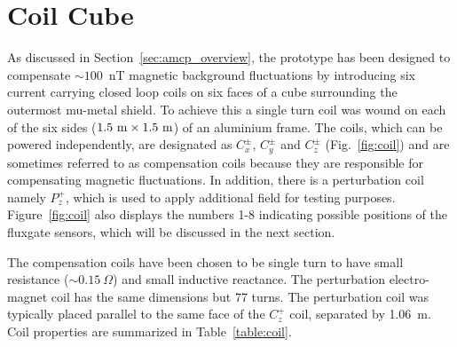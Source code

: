 
\section{Coil Cube}\label{sec:cube}



As discussed in Section~\ref{sec:amcp_overview}, the prototype has been designed to compensate $\sim 100$~nT magnetic background fluctuations by introducing six current carrying closed loop coils on six faces of a cube surrounding the outermost mu-metal shield. To achieve this a single turn coil was wound on each of the six sides ($\rm 1.5~m\times1.5~m$) of an aluminium frame. The coils, which can be powered independently, are designated as $C_x^\pm$, $C_y^\pm$ and $C_z^\pm$ (Fig.~\ref{fig:coil}) and are sometimes referred to as compensation coils because they are responsible for compensating magnetic fluctuations. In addition, there is a perturbation coil namely $P_z^+$, which is used to apply additional field for testing purposes. Figure~\ref{fig:coil} also displays the numbers 1-8 indicating possible positions of the fluxgate sensors, which will be discussed in the next section.


The compensation coils have been chosen to be single turn to have small resistance ($\sim0.15~\Omega$) and small inductive reactance. The perturbation electro-magnet coil has the same dimensions but 77 turns. The perturbation coil was typically placed parallel to the same face of the $C_z^+$ coil, separated by 1.06~m. Coil properties are summarized in Table~\ref{table:coil}. 

